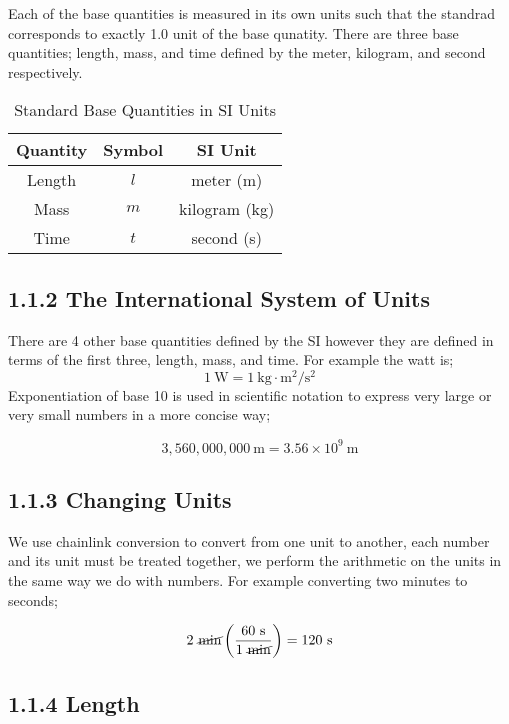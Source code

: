 \documentclass{article}
\begin{document}
Each of the base quantities is measured in its own units such that the standrad corresponds to exactly 1.0 unit of the base qunatity. There are three base quantities; length, mass, and time defined by the meter, kilogram, and second respectively.
\begin{table}[h]
    \centering
    \begin{tabular}{c|c|c}
	\textbf{Quantity} & \textbf{Symbol} & \textbf{SI Unit} \\ \hline
	Length & $l$ & meter (m) \\
	Mass & $m$ & kilogram (kg) \\
	Time & $t$ & second (s) \\
    \end{tabular}
    \caption{Standard Base Quantities in SI Units}
    \label{tab:base_quantities}
\end{table}

\subsection*{1.1.2 The International System of Units}

There are 4 other base quantities defined by the SI however they are defined in terms of the first three, length, mass, and time. For example the watt is;
\[
	1\ \unit{\watt} = 1\ \unit{\kilo\gram} \cdot \unit{\meter^2\per\second^2}
\]
Exponentiation of base 10 is used in scientific notation to express very large or very small numbers in a more concise way;

\[
	3,560,000,000\ \unit{\meter} = 3.56 \times 10^9\ \unit{\meter}
\]

\subsection*{1.1.3 Changing Units}

We use chainlink conversion to convert from one unit to another, each number and its unit must be treated together, we perform the arithmetic on the units in the same way we do with numbers. For example converting two minutes to seconds;

\[
	2\ \cancel{\unit{\minute}} \left( \frac{60\ \unit{\second}}{1\ \cancel{\unit{\minute}}} \right) = 120\ \unit{\second}
\]

\subsection*{1.1.4 Length}
\end{document}
